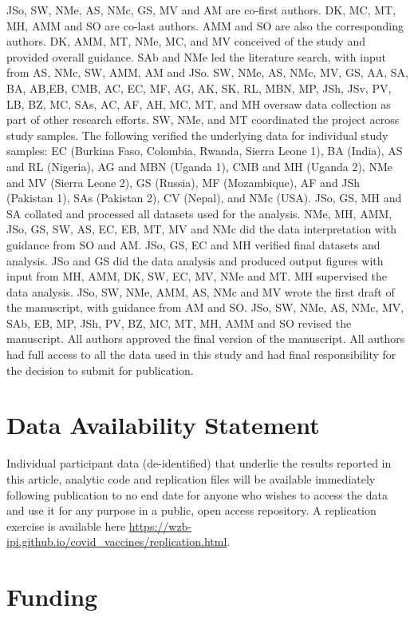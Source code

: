 \documentclass[
  12pt,
]{article}
\begin{document}
JSo, SW, NMe, AS, NMc, GS, MV and AM are co-first authors. DK, MC, MT, MH, AMM and SO are co-last authors. AMM and SO are also the corresponding authors.
DK, AMM, MT, NMe, MC, and MV conceived of the study and provided overall guidance.
SAb and NMe led the literature search, with input from AS, NMc, SW, AMM, AM and JSo.
SW, NMe, AS, NMc, MV, GS, AA, SA, BA, AB,EB, CMB, AC, EC, MF, AG, AK, SK, RL, MBN, MP, JSh, JSv, PV, LB, BZ, MC, SAs, AC, AF, AH, MC, MT, and MH oversaw data collection as part of other research efforts.
SW, NMe, and MT coordinated the project across study samples.
The following verified the underlying data for individual study samples: EC (Burkina Faso, Colombia, Rwanda, Sierra Leone 1), BA (India), AS and RL (Nigeria), AG and MBN (Uganda 1), CMB and MH (Uganda 2), NMe and MV (Sierra Leone 2), GS (Russia), MF (Mozambique), AF and JSh (Pakistan 1), SAs (Pakistan 2), CV (Nepal), and NMc (USA).
JSo, GS, MH and SA collated and processed all datasets used for the analysis.
NMe, MH, AMM, JSo, GS, SW, AS, EC, EB, MT, MV and NMc did the data interpretation with guidance from SO and AM.
JSo, GS, EC and MH verified final datasets and analysis.
JSo and GS did the data analysis and produced output figures with input from MH, AMM, DK, SW, EC, MV, NMe and MT.
MH supervised the data analysis.
JSo, SW, NMe, AMM, AS, NMc and MV wrote the first draft of the manuscript, with guidance from AM and SO.
JSo, SW, NMe, AS, NMc, MV, SAb, EB, MP, JSh, PV, BZ, MC, MT, MH, AMM and SO revised the manuscript.
All authors approved the final version of the manuscript. All authors had full access to all the data used in this study and had final responsibility for the decision to submit for publication.

\hypertarget{data-availability-statement}{%
\section*{Data Availability Statement}\label{data-availability-statement}}

Individual participant data (de-identified) that underlie the results reported in this article, analytic code and replication files will be available immediately following publication to no end date for anyone who wishes to access the data and use it for any purpose in a public, open access repository. A replication exercise is available here \url{https://wzb-ipi.github.io/covid_vaccines/replication.html}.

\hypertarget{funding}{%
\section*{Funding}\label{funding}}
\end{document}
